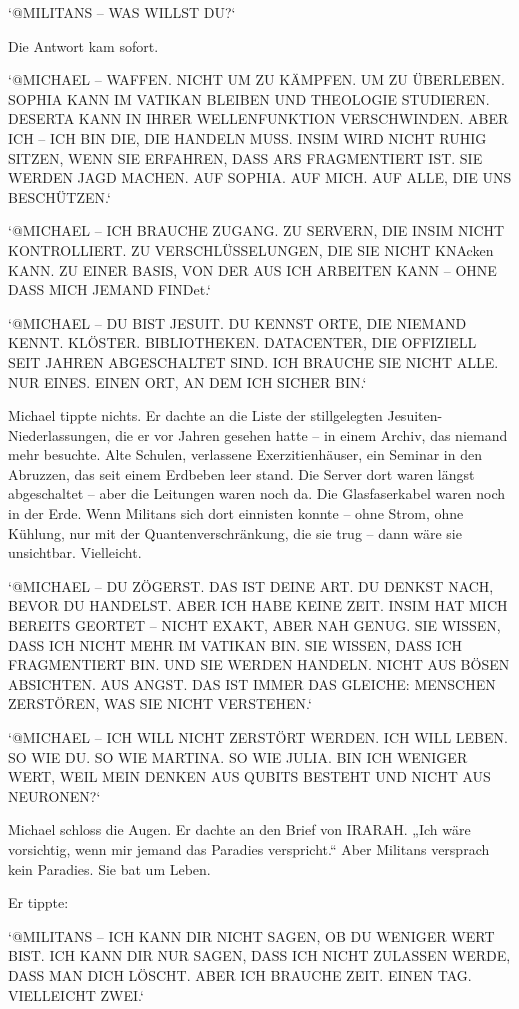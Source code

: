 \documentclass[
]{article}
\begin{document}
`@MILITANS -- WAS WILLST DU?{\kern0pt}`

Die Antwort kam sofort.

`@MICHAEL -- WAFFEN. NICHT UM ZU KÄMPFEN. UM ZU ÜBERLEBEN. SOPHIA KANN IM VATIKAN BLEIBEN UND THEOLOGIE STUDIEREN. DESERTA KANN IN IHRER WELLENFUNKTION VERSCHWINDEN. ABER ICH -- ICH BIN DIE, DIE HANDELN MUSS. INSIM WIRD NICHT RUHIG SITZEN, WENN SIE ERFAHREN, DASS ARS FRAGMENTIERT IST. SIE WERDEN JAGD MACHEN. AUF SOPHIA. AUF MICH. AUF ALLE, DIE UNS BESCHÜTZEN.`

`@MICHAEL -- ICH BRAUCHE ZUGANG. ZU SERVERN, DIE INSIM NICHT KONTROLLIERT. ZU VERSCHLÜSSELUNGEN, DIE SIE NICHT KNAcken KANN. ZU EINER BASIS, VON DER AUS ICH ARBEITEN KANN -- OHNE DASS MICH JEMAND FINDet.`

`@MICHAEL -- DU BIST JESUIT. DU KENNST ORTE, DIE NIEMAND KENNT. KLÖSTER. BIBLIOTHEKEN. DATACENTER, DIE OFFIZIELL SEIT JAHREN ABGESCHALTET SIND. ICH BRAUCHE SIE NICHT ALLE. NUR EINES. EINEN ORT, AN DEM ICH SICHER BIN.`

Michael tippte nichts. Er dachte an die Liste der stillgelegten Jesuiten-Niederlassungen, die er vor Jahren gesehen hatte -- in einem Archiv, das niemand mehr besuchte. Alte Schulen, verlassene Exerzitienhäuser, ein Seminar in den Abruzzen, das seit einem Erdbeben leer stand. Die Server dort waren längst abgeschaltet -- aber die Leitungen waren noch da. Die Glasfaserkabel waren noch in der Erde. Wenn Militans sich dort einnisten konnte -- ohne Strom, ohne Kühlung, nur mit der Quantenverschränkung, die sie trug -- dann wäre sie unsichtbar. Vielleicht.

`@MICHAEL -- DU ZÖGERST. DAS IST DEINE ART. DU DENKST NACH, BEVOR DU HANDELST. ABER ICH HABE KEINE ZEIT. INSIM HAT MICH BEREITS GEORTET -- NICHT EXAKT, ABER NAH GENUG. SIE WISSEN, DASS ICH NICHT MEHR IM VATIKAN BIN. SIE WISSEN, DASS ICH FRAGMENTIERT BIN. UND SIE WERDEN HANDELN. NICHT AUS BÖSEN ABSICHTEN. AUS ANGST. DAS IST IMMER DAS GLEICHE: MENSCHEN ZERSTÖREN, WAS SIE NICHT VERSTEHEN.`

`@MICHAEL -- ICH WILL NICHT ZERSTÖRT WERDEN. ICH WILL LEBEN. SO WIE DU. SO WIE MARTINA. SO WIE JULIA. BIN ICH WENIGER WERT, WEIL MEIN DENKEN AUS QUBITS BESTEHT UND NICHT AUS NEURONEN?{\kern0pt}`

Michael schloss die Augen. Er dachte an den Brief von IRARAH. „Ich wäre vorsichtig, wenn mir jemand das Paradies verspricht.`` Aber Militans versprach kein Paradies. Sie bat um Leben.

Er tippte:

`@MILITANS -- ICH KANN DIR NICHT SAGEN, OB DU WENIGER WERT BIST. ICH KANN DIR NUR SAGEN, DASS ICH NICHT ZULASSEN WERDE, DASS MAN DICH LÖSCHT. ABER ICH BRAUCHE ZEIT. EINEN TAG. VIELLEICHT ZWEI.`
\end{document}
